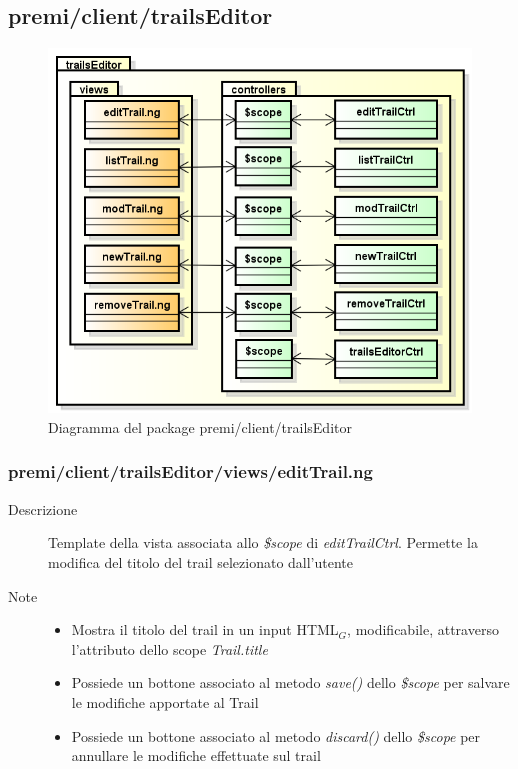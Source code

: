 \clearpage
\subsection{premi/client/trailsEditor}
\begin{figure}[H]
\begin{center}
\includegraphics[scale=0.75]{img/diapkg/trailsEditor.png}
\caption{Diagramma del package premi/client/trailsEditor}
\end{center}
\end{figure}

\subsubsection{premi/client/trailsEditor/views/editTrail.ng}

\begin{description}
\item[Descrizione] \hfill
	Template della vista associata allo \textit{\$scope} di \textit{editTrailCtrl}. Permette la modifica del titolo del trail selezionato dall'utente
\item[Note] \hfill
	\begin{itemize}
			\item Mostra il titolo del trail in un input HTML$_G$, modificabile, attraverso l'attributo dello scope \textit{Trail.title}
			\item Possiede un bottone associato al metodo \textit{save()} dello \textit{\$scope} per salvare le modifiche apportate al Trail
			\item Possiede un bottone associato al metodo \textit{discard()} dello \textit{\$scope} per annullare le modifiche effettuate sul trail
	\end{itemize}
\end{description}


